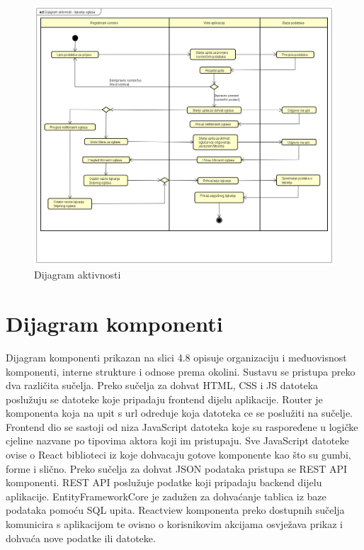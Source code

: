 			\begin{figure}[H]
				\includegraphics[scale=0.4]{slike/dijagram_ativnosti.PNG} %
				\centering
				\caption{Dijagram aktivnosti}
				\label{fig:dijagramAktivnosti}
			\end{figure}
			
			
			\eject
			
			\section{Dijagram komponenti}
			
			Dijagram komponenti prikazan na slici 4.8 opisuje organizaciju i međuovisnost
komponenti, interne strukture i odnose prema okolini. Sustavu se pristupa preko
dva različita sučelja. Preko sučelja za dohvat HTML, CSS i JS datoteka poslužuju se datoteke koje pripadaju frontend dijelu aplikacije. Router je komponenta koja na
upit s url odreduje koja datoteka ce se poslužiti na sučelje. Frontend dio se sastoji
od niza JavaScript datoteka koje su raspoređene u logičke cjeline nazvane po tipovima aktora koji im pristupaju. Sve JavaScript datoteke ovise o React biblioteci iz
koje dohvacaju gotove komponente kao što su gumbi, forme i slično. Preko sučelja za dohvat JSON podataka pristupa se REST API komponenti. REST API poslužuje podatke koji pripadaju backend dijelu aplikacije. EntityFrameworkCore je zadužen za dohvaćanje tablica iz baze podataka pomoću SQL upita. Reactview komponenta preko dostupnih sučelja komunicira s aplikacijom te ovisno o korisnikovim akcijama osvježava prikaz i dohvaća nove podatke ili datoteke.

